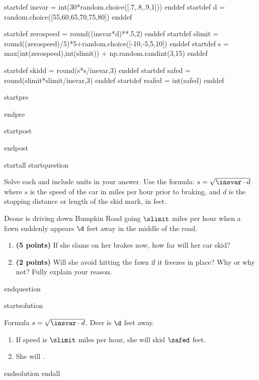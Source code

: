 startdef insvar = int(30*random.choice([.7,.8,.9,1])) enddef
startdef d = random.choice([55,60,65,70,75,80]) enddef

startdef zerospeed = round((insvar*d)**.5,2) enddef
startdef slimit = round((zerospeed)/5)*5+random.choice([-10,-5,5,10]) enddef %
startdef s = max(int(zerospeed),int(slimit)) + np.random.randint(3,15) enddef

startdef skidd = round(s*s/insvar,3) enddef
startdef safed = round(slimit*slimit/insvar,3) enddef
startdef rsafed = int(safed) enddef



startpre

endpre


startpost

endpost




startall
startquestion 
\item Solve each and include units in your answer. Use the formula: $s = \sqrt{\insvar \cdot d}$ where $s$ is the speed of the car in miles per hour prior to braking, and $d$ is the stopping distance or length of the skid mark, in feet. 

\vspace{3mm}

Deone is driving down Bumpkin Road going $\slimit$ miles per hour when a fawn suddenly appears $\d$ feet away in the middle of the road. \begin{enumerate}
\item {\bf (5 points)} If she slams on her brakes now, how far will her car skid? \vspace{4cm}
\item {\bf (2 points)} Will she avoid hitting the fawn if it freezes in place? Why or why not? Fully explain your reason. \vspace{3cm}
\end{enumerate}
endquestion 

startsolution
\item Formula $s = \sqrt{\insvar \cdot d}$. Deer is $\d$ feet away. \begin{enumerate}
\item If speed is $\slimit$ miles per hour, she will skid $\safed$ feet.
\item She will .
\end{enumerate}
endsolution
endall